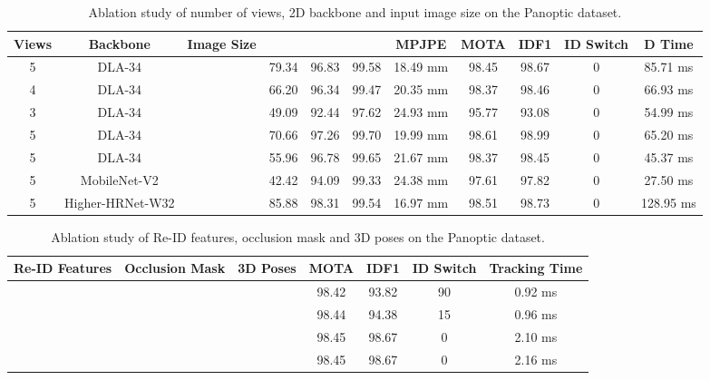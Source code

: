 \begin{table*}[]
    \setlength{\tabcolsep}{8pt}
    \centering
    \begin{tabular}{ccc|cccc|ccc|c}
        \toprule
         Views & Backbone & Image Size &  &  &  & MPJPE & MOTA & IDF1 & ID Switch & D Time\\
         \midrule
         5 & DLA-34 &  & 79.34 & 96.83 & 99.58 & 18.49 mm & 98.45 & 98.67 & 0 & 85.71 ms\\
         4 & DLA-34 &  & 66.20 & 96.34 & 99.47 & 20.35 mm & 98.37 & 98.46 & 0 & 66.93 ms\\
         3 & DLA-34 &  & 49.09 & 92.44 & 97.62 & 24.93 mm & 95.77 & 93.08 & 0 & 54.99 ms\\
         5 & DLA-34 &  & 70.66 & 97.26 & 99.70 & 19.99 mm & 98.61 & 98.99 & 0 & 65.20 ms\\
         5 & DLA-34 &  & 55.96 & 96.78 & 99.65 & 21.67 mm & 98.37 & 98.45 & 0 & 45.37 ms\\
         5 & MobileNet-V2 &  & 42.42 & 94.09 & 99.33 & 24.38 mm & 97.61 & 97.82 & 0 & 27.50 ms\\
         5 & Higher-HRNet-W32 &  & 85.88 & 98.31 & 99.54 & 16.97 mm & 98.51 & 98.73 & 0 & 128.95 ms\\
         \bottomrule
    \end{tabular}
    \caption{Ablation study of number of views, 2D backbone and input image size on the Panoptic dataset. }
    \label{tab:panoptic_2d}
\end{table*}

\begin{table*}[]
    \setlength{\tabcolsep}{9pt}
    \centering
    \begin{tabular}{ccc|ccc|c}
        \toprule
         Re-ID Features & Occlusion Mask & 3D Poses & MOTA & IDF1 & ID Switch & Tracking Time\\
         \midrule
          &  &  & 98.42 & 93.82 & 90 & 0.92 ms\\
          &  &  & 98.44 & 94.38 & 15 & 0.96 ms\\
          &  &  & 98.45 & 98.67 & 0 & 2.10 ms\\
          &  &  & 98.45 & 98.67 & 0 & 2.16 ms\\
         \bottomrule
    \end{tabular}
    \caption{Ablation study of Re-ID features, occlusion mask and 3D poses on the Panoptic dataset. }
    \label{tab:panoptic_tracking}
\end{table*}

